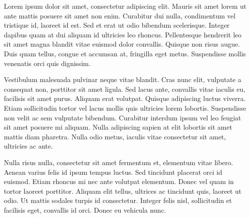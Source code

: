 Lorem ipsum dolor sit amet, consectetur adipiscing elit. Mauris sit amet lorem ut ante mattis posuere sit amet non enim. Curabitur dui nulla, condimentum vel tristique id, laoreet id est. Sed et erat ut odio bibendum scelerisque. Integer dapibus quam at dui aliquam id ultricies leo rhoncus. Pellentesque hendrerit leo sit amet magna blandit vitae euismod dolor convallis. Quisque non risus augue. Duis quam tellus, congue et accumsan at, fringilla eget metus. Suspendisse mollis venenatis orci quis dignissim.

Vestibulum malesuada pulvinar neque vitae blandit. Cras nunc elit, vulputate a consequat non, porttitor sit amet ligula. Sed lacus ante, convallis vitae iaculis eu, facilisis sit amet purus. Aliquam erat volutpat. Quisque adipiscing luctus viverra. Etiam sollicitudin tortor vel lacus mollis quis ultricies lorem lobortis. Suspendisse non velit ac sem vulputate bibendum. Curabitur interdum ipsum vel leo feugiat sit amet posuere mi aliquam. Nulla adipiscing sapien at elit lobortis sit amet mattis diam pharetra. Nulla odio metus, iaculis vitae consectetur sit amet, ultricies ac ante.

Nulla risus nulla, consectetur sit amet fermentum et, elementum vitae libero. Aenean varius felis id ipsum tempus luctus. Sed tincidunt placerat orci id euismod. Etiam rhoncus mi nec ante volutpat elementum. Donec vel quam in tortor laoreet porttitor. Aliquam elit tellus, ultrices ac tincidunt quis, laoreet ut odio. Ut mattis sodales turpis id consectetur. Integer felis nisl, sollicitudin et facilisis eget, convallis id orci. Donec eu vehicula nunc.